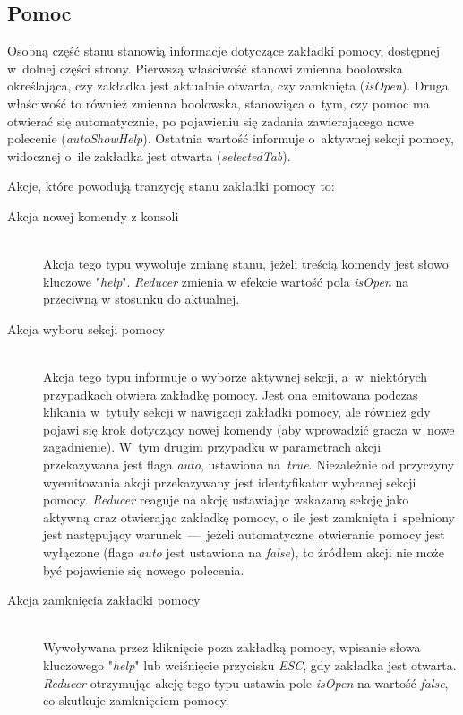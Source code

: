 \documentclass[12pt,a4paper,polish,thesis]{dcsbook}
\begin{document}
{	\subsection{Pomoc} \label{PomocStan}
	
	Osobną część stanu stanowią informacje dotyczące zakładki pomocy, dostępnej w~dolnej części strony. Pierwszą właściwość stanowi zmienna boolowska określająca, czy zakładka jest aktualnie otwarta, czy zamknięta (\textit{isOpen}). Druga właściwość to również zmienna boolowska, stanowiąca o~tym, czy pomoc ma otwierać się automatycznie, po pojawieniu się zadania zawierającego nowe polecenie (\textit{autoShowHelp}). Ostatnia wartość informuje o~aktywnej sekcji pomocy, widocznej o~ile zakładka jest otwarta (\textit{selectedTab}).
	
	Akcje, które powodują tranzycję stanu zakładki pomocy to:
	
	\begin{description}
	\item[Akcja nowej komendy z konsoli] \hfill \\
	Akcja tego typu wywołuje zmianę stanu, jeżeli treścią komendy jest słowo kluczowe "\textit{help}". \textit{Reducer} zmienia w efekcie wartość pola \textit{isOpen} na przeciwną w stosunku do aktualnej.
	
	\item[Akcja wyboru sekcji pomocy] \hfill \\
	Akcja tego typu informuje o wyborze aktywnej sekcji, a~w~niektórych przypadkach otwiera zakładkę pomocy. Jest ona emitowana podczas klikania w~tytuły sekcji w nawigacji zakładki pomocy, ale również gdy pojawi się krok dotyczący nowej komendy (aby wprowadzić gracza w~nowe zagadnienie). W~tym drugim przypadku w parametrach akcji przekazywana jest flaga \textit{auto}, ustawiona na~\textit{true}. Niezależnie od przyczyny wyemitowania akcji przekazywany jest identyfikator wybranej sekcji pomocy. \textit{Reducer} reaguje na akcję ustawiając wskazaną sekcję jako aktywną oraz otwierając zakładkę pomocy, o ile jest zamknięta i~spełniony jest następujący warunek~---~jeżeli automatyczne otwieranie pomocy jest wyłączone (flaga \textit{auto} jest ustawiona na \textit{false}), to źródłem akcji nie może być pojawienie się nowego polecenia.
	
	\item[Akcja zamknięcia zakładki pomocy] \hfill \\
	Wywoływana przez kliknięcie poza zakładką pomocy, wpisanie słowa kluczowego "\textit{help}" lub wciśnięcie przycisku \textit{ESC}, gdy zakładka jest otwarta. \textit{Reducer} otrzymując akcję tego typu ustawia pole \textit{isOpen} na wartość \textit{false}, co skutkuje zamknięciem pomocy.
	

\end{description}}
\end{document}
